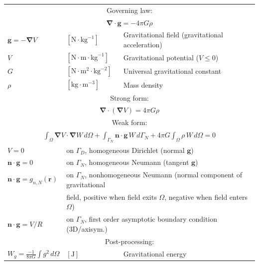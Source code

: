 \documentclass[letterpaper]{article}
\newcommand{\vect}[1]{\mathbf#1}
\newcommand{\nab}{\vect{\nabla}}
\begin{document}
\begin{table}[h!]
\centering
\begin{tabular}{lll}
\hline
\multicolumn{3}{c}{Governing law:} \\
\multicolumn{3}{c}{$\nab\cdot\vect{g}=-4\pi G\rho$}\\
$\vect{g}=-\nab V$ & $[\text{N}\cdot \text{kg}^{-1}%
]$ & Gravitational field (gravitational acceleration)\\
$V$ & $[%
\text{N}\cdot \text{m}\cdot \text{kg}^{-1}]$ & Gravitational potential ($V\leq0$)\\
$G$ & $[\text{N}\cdot\text{m}^{2}\cdot\text{kg}^{-2}]$ & Universal gravitational constant\\
$\rho$ & $[\text{kg}\cdot \text{m}^{-3}]$ & Mass density\\

\hline

\multicolumn{3}{c}{Strong form:} \\
\multicolumn{3}{c}{$\nab\cdot\left(\nab V\right)=4\pi G\rho$}\\
\hline

\multicolumn{3}{c}{Weak form:} \\[1pt]
\multicolumn{3}{c}{$\displaystyle\int_\Omega \nab V\cdot\nab W\,d\Omega+
\int_{\Gamma_N}\vect{n}\cdot\vect{g}\,W\,d{\Gamma_N}+
4\pi G\int_\Omega \rho\,W\,d\Omega=0$}\\[8pt]
 $V=0$ & \multicolumn{2}{l}{on $\Gamma_D$, homogeneous Dirichlet (normal $\vect{g}$)}\\
$\vect{n}\cdot\vect{g}=0$ & \multicolumn{2}{l}{on $\Gamma_N$, homogeneous Neumann (tangent $\vect{g}$)}\\
$\vect{n}\cdot\vect{g}=g_{n,N}(\vect{r})$ & \multicolumn{2}{l}{on $\Gamma_N$, nonhomogeneous Neumann (normal component of gravitational}\\
 & \multicolumn{2}{l}{field, positive when field exits $\Omega$, negative when field enters $\Omega$)}\\
 $\vect{n}\cdot\vect{g}=V/R$ & \multicolumn{2}{l}{on $\Gamma_N$, first order asymptotic boundary condition (3D/axisym.)}\\

\hline
\multicolumn{3}{c}{Post-processing:} \\
$W_{g}=\frac{-1}{8\pi G}\!\int g^2\,d\Omega$ & $[\text{J}]$ & Gravitational energy\\[1pt]

\hline
\end{tabular}
\end{table}
\end{document}
